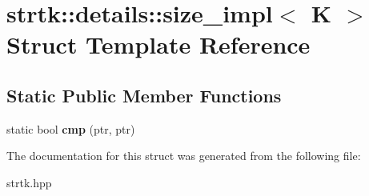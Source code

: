 \hypertarget{structstrtk_1_1details_1_1size__impl}{\section{strtk\-:\-:details\-:\-:size\-\_\-impl$<$ K $>$ Struct Template Reference}
\label{structstrtk_1_1details_1_1size__impl}
}
\subsection*{Static Public Member Functions}
\begin{DoxyCompactItemize}
\item 
\hypertarget{structstrtk_1_1details_1_1size__impl_a78dc08be6cc16126bdc1b1a177964edd}{static bool {\bfseries cmp} (ptr, ptr)}\label{structstrtk_1_1details_1_1size__impl_a78dc08be6cc16126bdc1b1a177964edd}

\end{DoxyCompactItemize}


The documentation for this struct was generated from the following file\-:\begin{DoxyCompactItemize}
\item 
strtk.\-hpp\end{DoxyCompactItemize}
